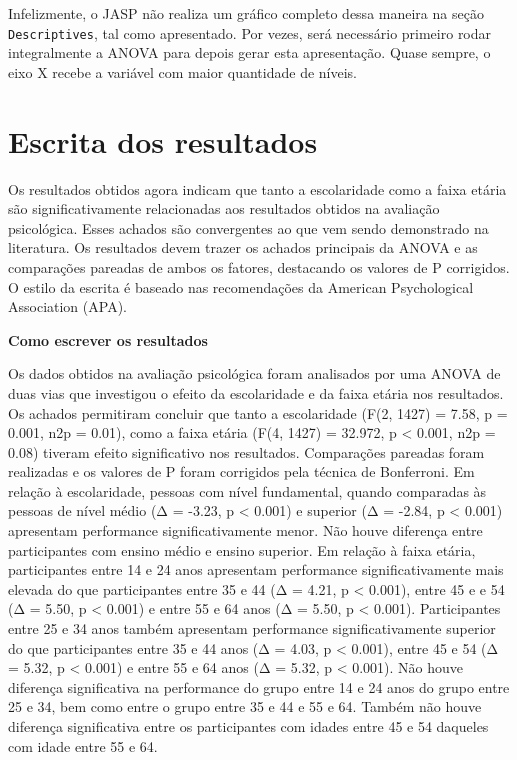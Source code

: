 \documentclass[
]{book}
\begin{document}
Infelizmente, o JASP não realiza um gráfico completo dessa maneira na
seção \texttt{Descriptives}, tal como apresentado. Por vezes, será
necessário primeiro rodar integralmente a ANOVA para depois gerar esta
apresentação. Quase sempre, o eixo X recebe a variável com maior
quantidade de níveis.

\hypertarget{escrita-dos-resultados-6}{%
\section{Escrita dos resultados}\label{escrita-dos-resultados-6}}

Os resultados obtidos agora indicam que tanto a escolaridade como a
faixa etária são significativamente relacionadas aos resultados obtidos
na avaliação psicológica. Esses achados são convergentes ao que vem
sendo demonstrado na literatura. Os resultados devem trazer os achados
principais da ANOVA e as comparações pareadas de ambos os fatores,
destacando os valores de P corrigidos. O estilo da escrita é baseado nas
recomendações da American Psychological Association (APA).

\begin{writing}
\textbf{Como escrever os resultados}

Os dados obtidos na avaliação psicológica foram analisados por uma ANOVA
de duas vias que investigou o efeito da escolaridade e da faixa etária
nos resultados. Os achados permitiram concluir que tanto a escolaridade
(F(2, 1427) = 7.58, p = 0.001, n2p = 0.01), como a faixa etária (F(4,
1427) = 32.972, p \textless{} 0.001, n2p = 0.08) tiveram efeito
significativo nos resultados. Comparações pareadas foram realizadas e os
valores de P foram corrigidos pela técnica de Bonferroni. Em relação à
escolaridade, pessoas com nível fundamental, quando comparadas às
pessoas de nível médio (Δ = -3.23, p \textless{} 0.001) e superior (Δ =
-2.84, p \textless{} 0.001) apresentam performance significativamente
menor. Não houve diferença entre participantes com ensino médio e ensino
superior. Em relação à faixa etária, participantes entre 14 e 24 anos
apresentam performance significativamente mais elevada do que
participantes entre 35 e 44 (Δ = 4.21, p \textless{} 0.001), entre 45 e
e 54 (Δ = 5.50, p \textless{} 0.001) e entre 55 e 64 anos (Δ = 5.50, p
\textless{} 0.001). Participantes entre 25 e 34 anos também apresentam
performance significativamente superior do que participantes entre 35 e
44 anos (Δ = 4.03, p \textless{} 0.001), entre 45 e 54 (Δ = 5.32, p
\textless{} 0.001) e entre 55 e 64 anos (Δ = 5.32, p \textless{} 0.001).
Não houve diferença significativa na performance do grupo entre 14 e 24
anos do grupo entre 25 e 34, bem como entre o grupo entre 35 e 44 e 55 e
64. Também não houve diferença significativa entre os participantes com
idades entre 45 e 54 daqueles com idade entre 55 e 64.
\end{writing}
\end{document}

